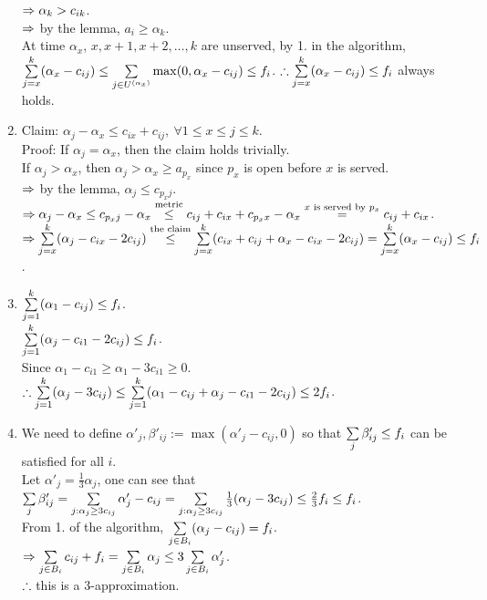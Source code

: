 \begin{pr}
\begin{enumerate}
$\Rightarrow\alpha_k>c_{ik}$.\\
$\Rightarrow$ by the lemma, $a_i\geq\alpha_k$.\\
At time $\alpha_x$, $x, x+1, x+2, \dots, k$ are unserved, by 1. in the algorithm, $\sum\limits_{j=x}^k(\alpha_x-c_{ij})\leq\sum\limits_{j\in U^{(\alpha_x)}}\max(0, \alpha_x-c_{ij})\leq f_i$.
$\therefore\sum\limits_{j=x}^k(\alpha_x-c_{ij})\leq f_i$ always holds.
\item Claim: $\alpha_j-\alpha_x\leq c_{ix}+c_{ij},\ \forall 1\leq x\leq j\leq k$.\\
Proof: If $\alpha_j=\alpha_x$, then the claim holds trivially.\\
If $\alpha_j>\alpha_x$, then $\alpha_j>\alpha_x\geq a_{p_x}$ since $p_x$ is open before $x$ is served.\\
$\Rightarrow$ by the lemma, $\alpha_j\leq c_{p_xj}$.\\
$\Rightarrow\alpha_j-\alpha_x\leq c_{p_xj}-\alpha_x\overset{\text{metric}}\leq c_{ij}+c_{ix}+c_{p_xx}-\alpha_x\overset{x\text{ is served by }p_x}=c_{ij}+c_{ix}$.\\
$\Rightarrow\sum\limits_{j=x}^k(\alpha_j-c_{ix}-2c_{ij})\overset{\text{the claim}}\leq\sum\limits_{j=x}^k(c_{ix}+c_{ij}+\alpha_x-c_{ix}-2c_{ij})=\sum\limits_{j=x}^k(\alpha_x-c_{ij})\leq f_i$.
\item $\sum\limits_{j=1}^k(\alpha_1-c_{ij})\leq f_i$.\\
$\sum\limits_{j=1}^k(\alpha_j-c_{i1}-2c_{ij})\leq f_i$.\\
Since $\alpha_1-c_{i1}\geq\alpha_1-3c_{i1}\geq0$.\\
$\therefore\sum\limits_{j=1}^k(\alpha_j-3c_{ij})\leq\sum\limits_{j=1}^k(\alpha_1-c_{ij}+\alpha_j-c_{i1}-2c_{ij})\leq2f_i$.
\item We need to define $\alpha'_j, \beta'_{ij}:=\max(\alpha'_j-c_{ij}, 0)$ so that $\sum\limits_j\beta'_{ij}\leq f_i$ can be satisfied for all $i$.\\
Let $\alpha'_j=\frac13\alpha_j$, one can see that $\sum\limits_j\beta'_{ij}=\sum\limits_{j:\alpha_j\geq3c_{ij}}\alpha'_j-c_{ij}=\sum\limits_{j:\alpha_j\geq3c_{ij}}\frac13(\alpha_j-3c_{ij})\leq\frac23f_i\leq f_i$.\\
From 1. of the algorithm, $\sum\limits_{j\in B_i}(\alpha_j-c_{ij})=f_i$.\\
$\Rightarrow\sum\limits_{j\in B_i}c_{ij}+f_i=\sum\limits_{j\in B_i}\alpha_j\leq3\sum\limits_{j\in B_i}\alpha'_j$.\\
$\therefore$ this is a $3$-approximation.
\end{enumerate}
\end{pr}
